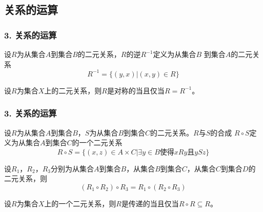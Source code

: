 \documentclass{beamer}
\begin{document}
\begin{CJK*}{UTF8}{gbsn}
\section{关系的运算}
\begin{frame}
  \frametitle{3. 关系的运算}
  \begin{Def}
    设$R$为从集合$A$到集合$B$的二元关系，$R$的\alert{逆}$R^{-1}$定义为从集合$B$
    到集合$A$的二元关系
    \[R^{-1}=\{(y,x)|(x,y)\in R\}\]
  \end{Def}\pause
  \begin{Thm}
    设$R$为集合$X$上的二元关系，则$R$是对称的当且仅当$R=R^{-1}$。
  \end{Thm}  
\end{frame}
\begin{frame}
  \frametitle{3. 关系的运算}
  \begin{Def}\justifying\let\raggedright\justifying
    设$R$为从集合$A$到集合$B$，$S$为从集合$B$到集合$C$的二元关系。$R$与$S$的合成
    $R\circ S$定义为从集合$A$到集合$C$的一个二元关系
    \[R\circ S = \{(x,z)\in A \times C |  \exists y \in B \text{使得} xRy \text{且} ySz\}\]
  \end{Def}\pause
    \begin{Thm}
    设$R_1$，$R_2$，$R_3$分别为从集合$A$到集合$B$，从集合$B$到集合$C$，从集合$C$到集合$D$的二元关系，则
    \[(R_1 \circ R_2)\circ R_3 = R_1 \circ (R_2 \circ R_3)\]
  \end{Thm}\pause
  \begin{Thm}
    设$R$为集合$X$上的一个二元关系，则$R$是传递的当且仅当$R\circ R \subseteq R$。
  \end{Thm}\pause
\end{frame}


\end{CJK*}
\end{document}

